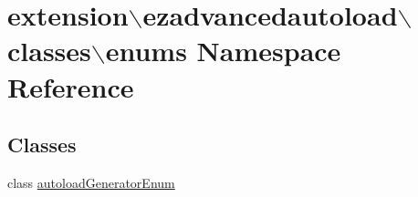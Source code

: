 \hypertarget{namespaceextension_1_1ezadvancedautoload_1_1classes_1_1enums}{\section{extension$\backslash$ezadvancedautoload$\backslash$classes$\backslash$enums \-Namespace \-Reference}
\label{namespaceextension_1_1ezadvancedautoload_1_1classes_1_1enums}
}
\subsection*{\-Classes}
\begin{DoxyCompactItemize}
\item 
class \hyperlink{classextension_1_1ezadvancedautoload_1_1classes_1_1enums_1_1autoload_generator_enum}{autoload\-Generator\-Enum}
\end{DoxyCompactItemize}
